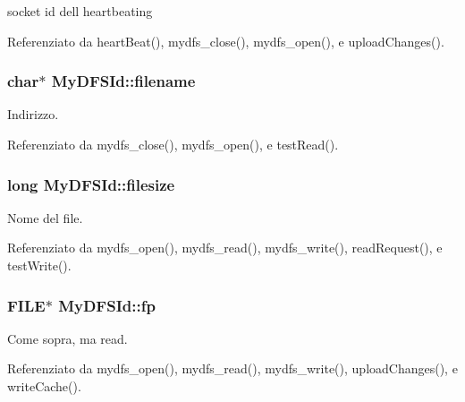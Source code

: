 socket id dell\textquotesingle{} heartbeating 



Referenziato da heart\+Beat(), mydfs\+\_\+close(), mydfs\+\_\+open(), e upload\+Changes().

\subsubsection[{\texorpdfstring{filename}{filename}}]{\setlength{\rightskip}{0pt plus 5cm}char$\ast$ My\+D\+F\+S\+Id\+::filename}\hypertarget{structMyDFSId_ac0e1b8c96d859982c1a7d49f9e929e48}{}\label{structMyDFSId_ac0e1b8c96d859982c1a7d49f9e929e48}


Indirizzo. 



Referenziato da mydfs\+\_\+close(), mydfs\+\_\+open(), e test\+Read().

\subsubsection[{\texorpdfstring{filesize}{filesize}}]{\setlength{\rightskip}{0pt plus 5cm}long My\+D\+F\+S\+Id\+::filesize}\hypertarget{structMyDFSId_a394540d568f1fa235d096fd790d2891f}{}\label{structMyDFSId_a394540d568f1fa235d096fd790d2891f}


Nome del file. 



Referenziato da mydfs\+\_\+open(), mydfs\+\_\+read(), mydfs\+\_\+write(), read\+Request(), e test\+Write().

\subsubsection[{\texorpdfstring{fp}{fp}}]{\setlength{\rightskip}{0pt plus 5cm}F\+I\+LE$\ast$ My\+D\+F\+S\+Id\+::fp}\hypertarget{structMyDFSId_ae2badd91d3b506420a9e49554df8212d}{}\label{structMyDFSId_ae2badd91d3b506420a9e49554df8212d}


Come sopra, ma read. 



Referenziato da mydfs\+\_\+open(), mydfs\+\_\+read(), mydfs\+\_\+write(), upload\+Changes(), e write\+Cache().

